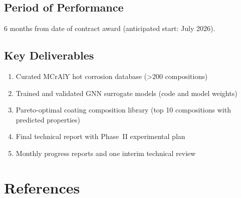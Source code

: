 \documentclass[11pt,letterpaper]{article}
\begin{document}
\subsection{Period of Performance}

6 months from date of contract award (anticipated start: July 2026).

\subsection{Key Deliverables}

\begin{enumerate}[nosep]
  \item Curated MCrAlY hot corrosion database (\textgreater200 compositions)
  \item Trained and validated GNN surrogate models (code and model weights)
  \item Pareto-optimal coating composition library (top 10 compositions with predicted properties)
  \item Final technical report with Phase~II experimental plan
  \item Monthly progress reports and one interim technical review
\end{enumerate}


\section*{References}
\label{sec:references}
\end{document}
